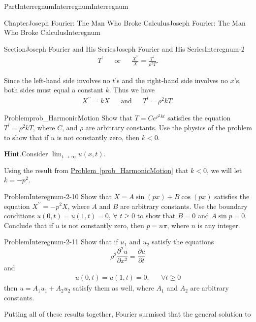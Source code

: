 \documentclass[oneside,10pt,]{book}
\newcommand{\blocktitlefont}{\relax}
\newcommand{\xreffont}{\relax}
\numberwithin{equation}{part}
\def\limit#1#2#3{{\displaystyle\lim_{#1\rightarrow #2}#3}}
\newcommand{\lt}{<}
\newcommand{\amp}{&}
\begin{document}
\begin{partptx}{Part}{Interregnum}{}{Interregnum}{}{}{Interregnum}
\begin{chapterptx}{Chapter}{Joseph Fourier: The Man Who Broke Calculus}{}{Joseph Fourier: The Man Who Broke Calculus}{}{}{Interegnum}
\begin{sectionptx}{Section}{Joseph Fourier and His Series}{}{Joseph Fourier and His Series}{}{}{Interegnum-2}
\begin{align*}
T^\prime\amp{}\amp{}\text{or}\amp{}\amp{}
\frac{X^{\prime\prime}}{X}=\frac{T^\prime}{\rho^2T}\text{.}
\end{align*}
%
\par
Since the left-hand side involves no \(t\)'s and the right-hand side involves no \(x\)'s, both sides must equal a constant \(k\). Thus we have%
\begin{align*}
X^{\prime\prime}=k X\amp{}\amp{}\text{and}\amp{}\amp{}
T^\prime=\rho^2k T.
\end{align*}
%
\begin{problem}{Problem}{}{prob_HarmonicMotion}%
 Show that \(T=Ce^{\rho^2kt}\) satisfies the equation \(T^\prime=\rho^2k T\), where \(C\), and \(\rho\) are arbitrary constants.  Use the physics of the problem to show that if \(u\) is not constantly zero, then \(k\lt 0\).%
\par\smallskip%
\noindent\textbf{\blocktitlefont Hint}.\hypertarget{prob_HarmonicMotion-2}{}\quad{}Consider \(\limit{t}{\infty}{u(x,t)}\).%
\end{problem}
Using the result from \hyperref[prob_HarmonicMotion]{Problem~{\xreffont\ref{prob_HarmonicMotion}}} that \(k\lt 0\), we will let \(k=-p^2\).%
\begin{problem}{Problem}{}{Interegnum-2-10}%
Show that \(X=A\sin\left(px\right)+B\cos\left(px\right)\) satisfies the equation \(X^{\prime\prime}=-p^2X\), where \(A\) and \(B\) are arbitrary constants.  Use the boundary conditions \(u(0,t)=u(1,t)=0\), \(\forall\) \(t\geq 0\) to show that \(B=0\) and \(A\sin p=0\).  Conclude that if \(u\) is not constantly zero, then \(p=n\pi\), where \(n\) is any integer.%
\end{problem}
\begin{problem}{Problem}{}{Interegnum-2-11}%
Show that if \(u_1\) and \(u_2\) satisfy the equations%
\begin{equation*}
\rho^2\frac{\partial^2u}{\partial x^2}=\frac{\partial
u}{\partial t}
\end{equation*}
and%
\begin{align*}
u(0,t)=u(1,t)=0,\amp{}\amp{} \forall t\geq   0
\end{align*}
then \(u=A_1u_1+A_2u_2\) satisfy them as well, where \(A_1\) and \(A_2\) are arbitrary constants.%
\end{problem}
 Putting all of these results together, Fourier surmised that the general solution to%
\begin{align*}

\end{align*}
\end{sectionptx}
\end{chapterptx}
\end{partptx}
\end{document}
